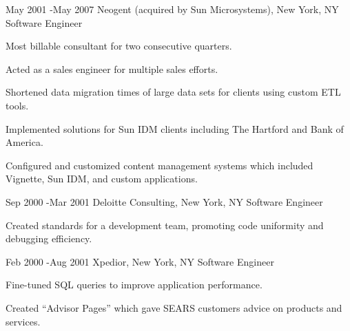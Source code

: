 \documentclass[10pt]{article} %
\begin{document}

\job
{May 2001 -}{May 2007}
{Neogent (acquired by Sun Microsystems), New York, NY}
{}
{Software Engineer}
{
\begin{itemize-noindent}
\item{Most billable consultant for two consecutive quarters.} 
\item{Acted as a sales engineer for multiple sales efforts.} 
\item{Shortened data migration times of large data sets for clients using custom ETL tools.} 
\item{Implemented solutions for Sun IDM clients including The Hartford and Bank of America.} 
\item{Configured and customized content management systems which included Vignette, Sun IDM, and custom applications.} 
\end{itemize-noindent}
}



\job
{Sep 2000 -}{Mar 2001}
{Deloitte Consulting, New York, NY}
{}
{Software Engineer}
{
\begin{itemize-noindent}
\item{Created standards for a development team, promoting code uniformity and debugging efficiency.}
\end{itemize-noindent}
}


\job
{Feb 2000 -}{Aug 2001}
{Xpedior, New York, NY}
{}
{Software Engineer}
{
\begin{itemize-noindent}
\item{Fine-tuned SQL queries to improve application performance.}
\item{Created “Advisor Pages” which gave SEARS customers advice on products and services.}
\end{itemize-noindent}
}
\end{document}
